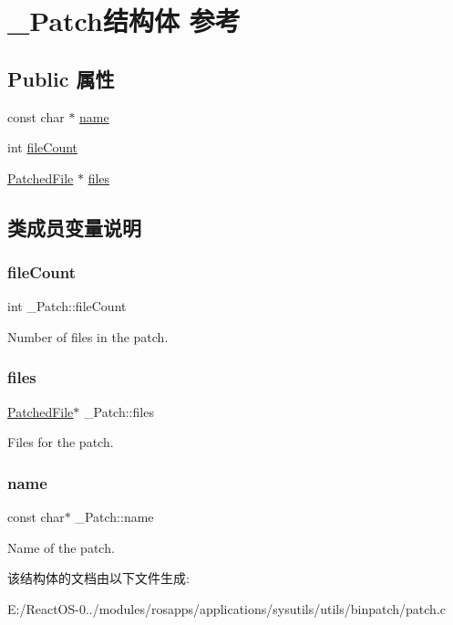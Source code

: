\hypertarget{struct___patch}{}\section{\+\_\+\+Patch结构体 参考}
\label{struct___patch}
\subsection*{Public 属性}
\begin{DoxyCompactItemize}
\item 
const char $\ast$ \hyperlink{struct___patch_a19980322def4d5b11ef683aaac6665d3}{name}
\item 
int \hyperlink{struct___patch_a2d6979e2ceada674742e6ae1f32ffe50}{file\+Count}
\item 
\hyperlink{struct___patched_file}{Patched\+File} $\ast$ \hyperlink{struct___patch_a59f394dd4667a57bbc7013f7bf43bc8e}{files}
\end{DoxyCompactItemize}


\subsection{类成员变量说明}
\mbox{\label{struct___patch_a2d6979e2ceada674742e6ae1f32ffe50}} 
\subsubsection{\texorpdfstring{file\+Count}{fileCount}}
{\footnotesize\ttfamily int \+\_\+\+Patch\+::file\+Count}

Number of files in the patch. \mbox{\label{struct___patch_a59f394dd4667a57bbc7013f7bf43bc8e}} 
\subsubsection{\texorpdfstring{files}{files}}
{\footnotesize\ttfamily \hyperlink{struct___patched_file}{Patched\+File}$\ast$ \+\_\+\+Patch\+::files}

Files for the patch. \mbox{\label{struct___patch_a19980322def4d5b11ef683aaac6665d3}} 
\subsubsection{\texorpdfstring{name}{name}}
{\footnotesize\ttfamily const char$\ast$ \+\_\+\+Patch\+::name}

Name of the patch. 

该结构体的文档由以下文件生成\+:\begin{DoxyCompactItemize}
\item 
E\+:/\+React\+O\+S-\/0../modules/rosapps/applications/sysutils/utils/binpatch/patch.\+c\end{DoxyCompactItemize}
